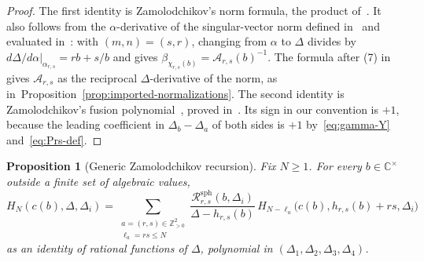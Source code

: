 \documentclass[twoside,10pt]{article}
\numberwithin{equation}{section}
\theoremstyle{slbody}
\newtheorem{proposition}[theorem]{Proposition}
\theoremstyle{definition}
\theoremstyle{remark}
\begin{document}
\begin{proof}
The first identity is Zamolodchikov's norm formula, the product
of~\cite[\S3, (17)]{Zamolodchikov1987}.  It also follows from the
\(\alpha\)-derivative of the singular-vector norm defined in~\cite[(6.1)]{Zamolodchikov2004}
and evaluated in~\cite[(7.5)]{Zamolodchikov2004}: with \((m,n)=(s,r)\), changing
from \(\alpha\) to \(\Delta\) divides by \(d\Delta/d\alpha|_{\alpha_{r,s}}=rb+s/b\) and
gives \(\beta_{\chi_{r,s}(b)}=\mathcal A_{r,s}(b)^{-1}\).  The formula after (7)
in~\cite[\S3]{HadaszJaskolskiSuchanek2010} gives \(\mathcal A_{r,s}\) as
the reciprocal \(\Delta\)-derivative of the norm, as
in~Proposition~\ref{prop:imported-normalizations}.  The second identity is Zamolodchikov's
fusion polynomial~\cite[\S3, (17)]{Zamolodchikov1987}, proved
in~\cite[\S5, (5.9)--(5.12)]{Zamolodchikov2004}.  Its sign in our convention is \(+1\),
because the leading coefficient in \(\Delta_b-\Delta_a\) of both sides is
\(+1\) by~\eqref{eq:gamma-Y} and~\eqref{eq:Prs-def}.
\end{proof}

\begin{proposition}[Generic Zamolodchikov recursion]\label{prop:generic-recursion-sph}
Fix \(N\geq1\).  For every \(b\in\mathbb C^\times\) outside a finite set of
algebraic values,
\begin{equation}\label{eq:generic-rec}
 H_N(c(b),\Delta,\Delta_i)
 =\sum_{\substack{a=(r,s)\in\mathbb Z_{>0}^2\\\ell_a=rs\leq N}}
  \frac{\mathcal R^{\mathrm{sph}}_{r,s}(b,\Delta_i)}{\Delta-h_{r,s}(b)}\,
  H_{N-\ell_a}\bigl(c(b),h_{r,s}(b)+rs,\Delta_i\bigr)
\end{equation}
as an identity of rational functions of \(\Delta\), polynomial in
\((\Delta_1,\Delta_2,\Delta_3,\Delta_4)\).
\end{proposition}
\end{document}
